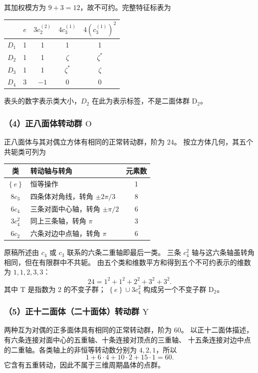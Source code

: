 其加权模方为 $9+3=12$，故不可约。完整特征标表为
\begin{center}
\begin{tabular}{c|cccc}
\toprule
 & $e$ & $3c_2^{\left(2\right)}$ & $4c_3^{\left(1\right)}$ & $4\left(c_3^{\left(1\right)}\right)^2$\\\midrule
$D_1$ & 1 & 1 & 1 & 1\\
$D_2$ & 1 & 1 & $\zeta$ & $\zeta^*$\\
$D_3$ & 1 & 1 & $\zeta^*$ & $\zeta$\\
$D_4$ & 3 & $-1$ & 0 & 0\\\bottomrule
\end{tabular}
\end{center}
表头的数字表示类大小，$D_2$ 在此为表示标签，不是二面体群 $\mathrm{D}_2$。

\subsubsection*{（4）正八面体转动群 $\mathrm{O}$}
正八面体与其对偶立方体有相同的正常转动群，阶为 $24$。
按立方体几何，其五个共轭类可列为
\begin{center}
\begin{tabular}{clc}
\toprule
类 & 转动轴与转角 & 元素数\\\midrule
$\left\{e\right\}$ & 恒等操作 & 1\\
$8c_3$ & 四条体对角线，转角 $\pm2\pi/3$ & 8\\
$6c_4$ & 三条对面中心轴，转角 $\pm\pi/2$ & 6\\
$3c_4^2$ & 同上三条轴，转角 $\pi$ & 3\\
$6c_2$ & 六条对边中点轴，转角 $\pi$ & 6\\\bottomrule
\end{tabular}
\end{center}
原稿所述由 $c_4$ 或 $c_3$ 联系的六条二重轴即最后一类。
三条 $c_4^2$ 轴与这六条轴虽转角相同，但在有限群中不共轭。
由五个类和维数平方和得到五个不可约表示的维数为 $1,1,2,3,3$：
\begin{equation}
24=1^2+1^2+2^2+3^2+3^2.
\end{equation}
其中 $\mathrm{T}$ 是指数为 $2$ 的不变子群；
$\left\{e\right\}\cup3c_4^2$ 构成另一个不变子群 $\mathrm{D}_2$。

\subsubsection*{（5）正十二面体（二十面体）转动群 $\mathrm{Y}$}
两种互为对偶的正多面体具有相同的正常转动群，阶为 $60$。
以正十二面体描述，有六条连接对面中心的五重轴、十条连接对顶点的三重轴、
十五条连接对边中点的二重轴。各类轴上的非恒等转动数分别为 $4,2,1$，所以
\begin{equation}
1+6\cdot4+10\cdot2+15\cdot1=60.
\end{equation}
它含有五重转动，因此不属于三维周期晶体的点群。

